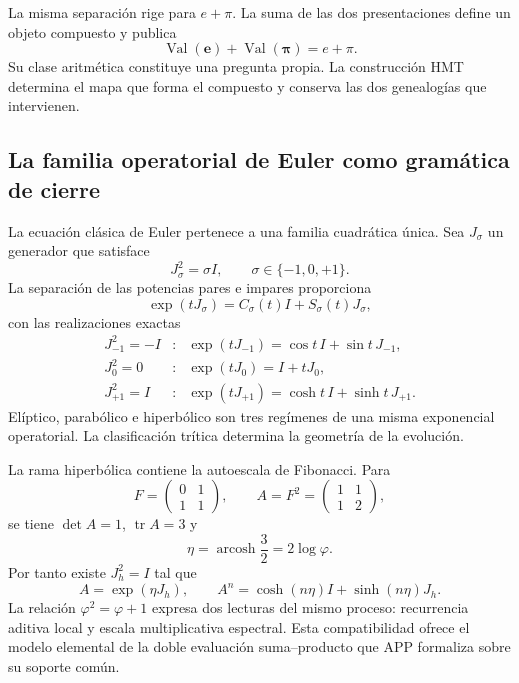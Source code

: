 La misma separación rige para \(e+\pi\). La suma de las dos presentaciones
define un objeto compuesto y publica
\[
 \operatorname{Val}(\boldsymbol e)+
 \operatorname{Val}(\boldsymbol\pi)=e+\pi.
\]
Su clase aritmética constituye una pregunta propia. La construcción HMT
determina el mapa que forma el compuesto y conserva las dos genealogías que
intervienen.

\subsection{La familia operatorial de Euler como gramática de cierre}

La ecuación clásica de Euler pertenece a una familia cuadrática única. Sea
\(J_\sigma\) un generador que satisface
\[
 J_\sigma^2=\sigma I,
 \qquad \sigma\in\{-1,0,+1\}.
\]
La separación de las potencias pares e impares proporciona
\begin{equation}
 \exp(tJ_\sigma)=C_\sigma(t)I+S_\sigma(t)J_\sigma,
 \label{p3-83-c44-s2:eq:euler-trigeometrico-cierre-numero}
\end{equation}
con las realizaciones exactas
\[
\begin{array}{ccl}
J_{-1}^2=-I&:&\exp(tJ_{-1})=\cos t\,I+\sin t\,J_{-1},\\[1mm]
J_{0}^2=0&:&\exp(tJ_{0})=I+tJ_{0},\\[1mm]
J_{+1}^2=I&:&\exp(tJ_{+1})=\cosh t\,I+\sinh t\,J_{+1}.
\end{array}
\]
Elíptico, parabólico e hiperbólico son tres regímenes de una misma
exponencial operatorial. La clasificación trítica determina la geometría de
la evolución.

La rama hiperbólica contiene la autoescala de Fibonacci. Para
\[
 F=\begin{pmatrix}0&1\\1&1\end{pmatrix},
 \qquad
 A=F^2=\begin{pmatrix}1&1\\1&2\end{pmatrix},
\]
se tiene \(\det A=1\), \(\operatorname{tr}A=3\) y
\[
 \eta=\operatorname{arcosh}\frac32=2\log\varphi.
\]
Por tanto existe \(J_h^2=I\) tal que
\begin{equation}
 A=\exp(\eta J_h),
 \qquad
 A^n=\cosh(n\eta)I+\sinh(n\eta)J_h.
 \label{p3-83-c44-s2:eq:fibonacci-euler-hiperbolico-cierre-numero}
\end{equation}
La relación \(\varphi^2=\varphi+1\) expresa dos lecturas del mismo proceso:
recurrencia aditiva local y escala multiplicativa espectral. Esta
compatibilidad ofrece el modelo elemental de la doble evaluación
suma--producto que APP formaliza sobre su soporte común.

